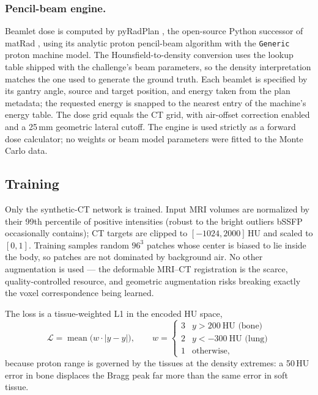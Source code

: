 \documentclass[runningheads]{llncs}
\begin{document}
\subsubsection{Pencil-beam engine.}
Beamlet dose is computed by pyRadPlan \cite{pyradplan}, the open-source Python successor of matRad \cite{matrad}, using its analytic proton pencil-beam algorithm with the \texttt{Generic} proton machine model. The Hounsfield-to-density conversion uses the lookup table shipped with the challenge's beam parameters, so the density interpretation matches the one used to generate the ground truth. Each beamlet is specified by its gantry angle, source and target position, and energy taken from the plan metadata; the requested energy is snapped to the nearest entry of the machine's energy table. The dose grid equals the CT grid, with air-offset correction enabled and a 25\,mm geometric lateral cutoff. The engine is used strictly as a forward dose calculator; no weights or beam model parameters were fitted to the Monte Carlo data.

\subsection{Training}
Only the synthetic-CT network is trained. Input MRI volumes are normalized by their 99th percentile of positive intensities (robust to the bright outliers bSSFP occasionally contains); CT targets are clipped to $[-1024, 2000]$\,HU and scaled to $[0,1]$. Training samples random $96^3$ patches whose center is biased to lie inside the body, so patches are not dominated by background air. No other augmentation is used --- the deformable MRI--CT registration is the scarce, quality-controlled resource, and geometric augmentation risks breaking exactly the voxel correspondence being learned.

The loss is a tissue-weighted L1 in the encoded HU space,
\begin{equation}
\mathcal{L} = \operatorname{mean}\bigl(w \cdot |\hat{y} - y|\bigr), \qquad
w = \begin{cases}
3 & y > 200\ \text{HU (bone)}\\
2 & y < -300\ \text{HU (lung)}\\
1 & \text{otherwise,}
\end{cases}
\end{equation}
because proton range is governed by the tissues at the density extremes: a 50\,HU error in bone displaces the Bragg peak far more than the same error in soft tissue.
\end{document}
